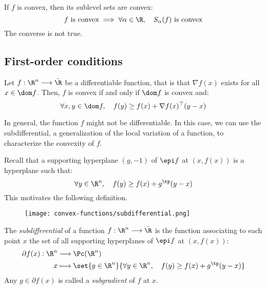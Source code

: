 \begin{property}
    If $f$ is convex, then its sublevel sets are convex:
    \begin{equation*}
        f \text{ is convex} \implies \forall \alpha\in\R, \quad S_\alpha(f) \text{ is convex}
    \end{equation*}
    The converse is not true.
\end{property}

\subsection{First-order conditions}
\begin{property}
    Let $f:\R^n\longrightarrow\bar{\R}$ be a differentiable function, that is that $\nabla f(x)$ exists for all $x\in\dom f$. Then, $f$ is convex if and only if $\dom f$ is convex and:
    \begin{equation*}
        \forall x,y\in\dom f, \quad f(y) \geq f(x) + \nabla f(x)^\top(y-x)
    \end{equation*}
\end{property}

In general, the function $f$ might not be differentiable. In this case, we can use the subdifferential, a generalization of the local variation of a function, to characterize the convexity of $f$.

Recall that a supporting hyperplane $(g, -1)$ of $\epi f$ at $(x, f(x))$ is a hyperplane such that:
\begin{equation*}
    \forall y\in\R^n, \quad f(y) \geq f(x) + g^\tp(y-x)
\end{equation*}
This motivates the following definition.

\begin{figure}[H]
    \centering
    \texttt{[image: convex-functions/subdifferential.png]}
\end{figure}

\begin{definition}[Subdifferential]
    The \emph{subdifferential} of a function $f:\R^n\longrightarrow\bar{\R}$ is the function associating to each point $x$ the set of all supporting hyperplanes of $\epi f$ at $(x, f(x))$:
    \begin{equation*}
        \begin{aligned}
            \partial f(x) : \R^n &\longrightarrow \Pc(\R^n) \\
            x &\longmapsto \set{g\in\R^n}{\forall y\in\R^n, \quad f(y) \geq f(x) + g^\tp(y-x)}
        \end{aligned}
    \end{equation*}
    Any $g\in\partial f(x)$ is called a \emph{subgradient} of $f$ at $x$.
\end{definition}

